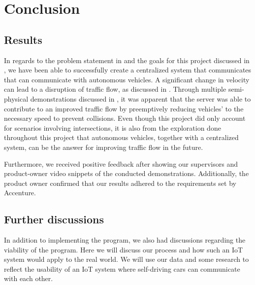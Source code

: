 \chapter{Conclusion}
\section{Results}
In regards to the problem statement in  and the goals for this project discussed in , we have been able to successfully create a centralized system that communicates that can communicate with autonomous vehicles. A significant change in velocity can lead to a disruption of traffic flow, as discussed in . Through multiple semi-physical demonstrations discussed in , it was apparent that the server was able to contribute to an improved traffic flow by preemptively reducing vehicles' to the necessary speed to prevent collisions. Even though this project did only account for scenarios involving intersections, it is also from the exploration done throughout this project that autonomous vehicles, together with a centralized system, can be the answer for improving traffic flow in the future.

Furthermore, we received positive feedback after showing our supervisors and product-owner video snippets of the conducted demonstrations. Additionally, the product owner confirmed that our results adhered to the requirements set by Accenture.




\section{Further discussions}
In addition to implementing the program, we also had discussions regarding the viability of the program. Here we will discuss our process and how such an IoT system would apply to the real world. We will use our data and some research to reflect the usability of an IoT system where self-driving cars can communicate with each other.


